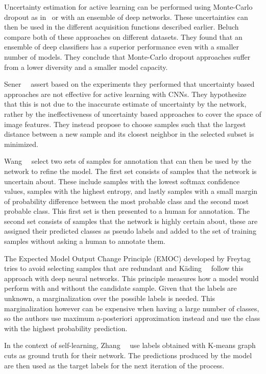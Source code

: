 Uncertainty estimation for active learning can be performed using Monte-Carlo dropout as in~\cite{gal2017deep} or with an ensemble of deep networks. These uncertainties can then be used in the different acquisition functions described earlier. Beluch~\etal~\cite{beluch2018power} compare both of these approaches on different datasets. They found that an ensemble of deep classifiers has a superior performance even with a smaller number of models. They conclude that Monte-Carlo dropout approaches suffer from a lower diversity and a smaller model capacity.

Sener~\etal~\cite{sener2017geometric} assert based on the experiments they performed that uncertainty based approaches are not effective for active learning with CNNs. They hypothesize that this is not due to the inaccurate estimate of uncertainty by the network, rather by the ineffectiveness of uncertainty based approaches to cover the space of image features. They instead propose to choose samples such that the largest distance between a new sample and its closest neighbor in the selected subset is minimized.

Wang~\etal~\cite{wang2017cost} select two sets of samples for annotation that can then be used by the network to refine the model. The first set consists of samples that the network is uncertain about. These include samples with the lowest softmax confidence values, samples with the highest entropy, and lastly samples with a small margin of probability difference between the most probable class and the second most probable class. This first set is then presented to a human for annotation. The second set consists of samples that the network is highly certain about, these are assigned their predicted classes as pseudo labels and added to the set of training samples without asking a human to annotate them.

The Expected Model Output Change Principle (EMOC) developed by Freytag~\etal~\cite{freytag2014selecting} tries to avoid selecting samples that are redundant and K{\"a}ding~\etal~\cite{kading2016active} follow this approach with deep neural networks. This principle measures how a model would perform with and without the candidate sample. Given that the labels are unknown, a marginalization over the possible labels is needed. This marginalization however can be expensive when having a large number of classes, so the authors use maximum a-posteriori approximation instead and use the class with the highest probability prediction.

In the context of self-learning, Zhang~\etal~\cite{zhang2018self} use labels obtained with K-means graph cuts as ground truth for their network. The predictions produced by the model are then used as the target labels for the next iteration of the process.  

